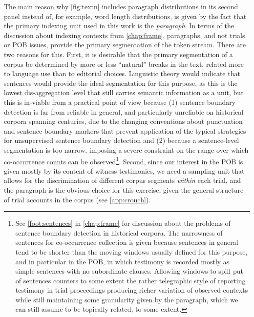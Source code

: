 The main reason why \autoref{fig:textn} includes paragraph distributions in its second panel instead of, for example, word length distributions, is given by the fact that the primary indexing unit used in this work is the \emph{paragraph}.
In terms of the discussion about indexing contexts from \autoref{chap:frame}, paragraphs, and not trials or POB issues, provide the primary segmentation of the token stream.
There are two reasons for this.
First, it is desirable that the primary segmentation of a corpus be determined by more or less ``natural'' breaks in the text, related more to language use than to editorial choices.
Linguistic theory would indicate that sentences would provide the ideal segmentation for this purpose, as this is the lowest dis-aggregation level that still carries semantic information as a unit, but this is in-viable from a practical point of view because (1) sentence boundary detection is far from reliable in general, and particularly unreliable on historical corpora spanning centuries, due to the changing conventions about punctuation and sentence boundary markers that prevent application of the typical strategies for unsupervised sentence boundary detection and (2) because a sentence-level segmentation is too narrow, imposing a severe constraint on the range over which co-occurrence counts can be observed\footnote{
    See \autoref{foot:sentences} in \autoref{chap:frame} for discussion about the problems of sentence boundary detection in historical corpora.
    The narrowness of sentences for co-occurrence collection is given because sentences in general tend to be shorter than the moving windows usually defined for this purpose, and in particular in the POB, in which testimony is recorded mostly as simple sentences with no subordinate clauses.
    Allowing windows to spill put of sentences counters to some extent the rather telegraphic style of reporting testimony in trial proceedings producing richer variation of observed contexts while still maintaining some granularity given by the paragraph, which we can still assume to be topically related, to some extent.
}.
Second, since our interest in the POB is given mostly by its content of witness testimonies, we need a sampling unit that allows for the discrimination of different corpus segments \emph{within} each trial, and the paragraph is the obvious choice for this exercise, given the general structure of trial accounts in the corpus (see \autoref{app:crouch}).

